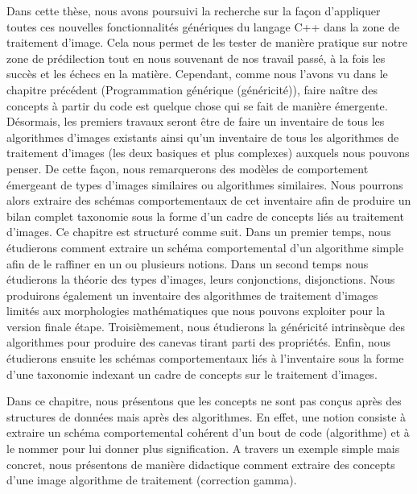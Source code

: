 Dans cette thèse, nous avons poursuivi la recherche sur la façon d'appliquer toutes ces nouvelles fonctionnalités
génériques du langage C++ dans la zone de traitement d'image. Cela nous permet de les tester de manière pratique sur
notre zone de prédilection tout en nous souvenant de nos travail passé, à la fois les succès et les échecs en la
matière. Cependant, comme nous l'avons vu dans le chapitre précédent (Programmation générique (généricité)), faire
naître des concepts à partir du code est quelque chose qui se fait de manière émergente. Désormais, les premiers travaux
seront être de faire un inventaire de tous les algorithmes d'images existants ainsi qu'un inventaire de tous les
algorithmes de traitement d'images (les deux basiques et plus complexes) auxquels nous pouvons penser. De cette façon,
nous remarquerons des modèles de comportement émergeant de types d'images similaires ou algorithmes similaires. Nous
pourrons alors extraire des schémas comportementaux de cet inventaire afin de produire un bilan complet taxonomie sous
la forme d'un cadre de concepts liés au traitement d'images. Ce chapitre est structuré comme suit. Dans un premier
temps, nous étudierons comment extraire un schéma comportemental d'un algorithme simple afin de le raffiner en un ou
plusieurs notions. Dans un second temps nous étudierons la théorie des types d'images, leurs conjonctions, disjonctions.
Nous produirons également un inventaire des algorithmes de traitement d'images limités aux morphologies mathématiques
que nous pouvons exploiter pour la version finale étape. Troisièmement, nous étudierons la généricité intrinsèque des
algorithmes pour produire des canevas tirant parti des propriétés. Enfin, nous étudierons ensuite les schémas
comportementaux liés à l'inventaire sous la forme d'une taxonomie indexant un cadre de concepts sur le traitement
d'images.

Dans ce chapitre, nous présentons que les concepts ne sont pas conçus après des structures de données mais après des
algorithmes. En effet, une notion consiste à extraire un schéma comportemental cohérent d'un bout de code (algorithme)
et à le nommer pour lui donner plus signification. A travers un exemple simple mais concret, nous présentons de manière
didactique comment extraire des concepts d'une image algorithme de traitement (correction gamma).
